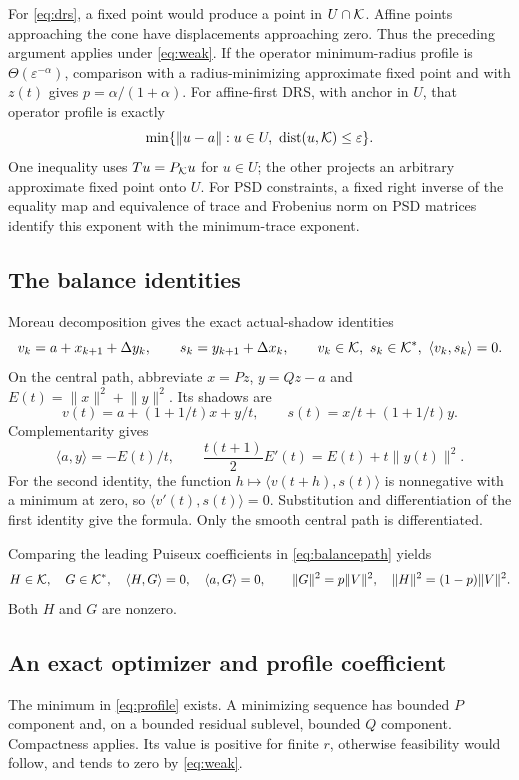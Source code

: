 \documentclass[11pt]{article}
\theoremstyle{remark}\newtheorem{remark}[theorem]{Remark}
\newcommand{\ip}[2]{\langle #1,#2\rangle}\newcommand{\norm}[1]{\lVert #1\rVert}
\newcommand{\eps}{\varepsilon}\newcommand{\dd}{\Delta}
\numberwithin{equation}{section}
\begin{document}
For \eqref{eq:drs}, a fixed point would produce a point in $U\cap\mathcal K$. Affine points approaching the cone have displacements approaching zero. Thus the preceding argument applies under \eqref{eq:weak}. If the operator minimum-radius profile is $\Theta(\eps^{-\alpha})$, comparison with a radius-minimizing approximate fixed point and with $z(t)$ gives $p=\alpha/(1+\alpha)$. For affine-first DRS, with anchor in $U$, that operator profile is exactly
\[
 \min\{\norm{u-a}:u\in U,\ \dist(u,\K)\leq\eps\}.
\]
One inequality uses $Tu=P_\mathcal K u$ for $u\in U$; the other projects an arbitrary approximate fixed point onto $U$. For PSD constraints, a fixed right inverse of the equality map and equivalence of trace and Frobenius norm on PSD matrices identify this exponent with the minimum-trace exponent.

\subsection{The balance identities}
Moreau decomposition gives the exact actual-shadow identities
\begin{equation}\label{eq:complement}
 v_k=a+x_{k+1}+\dd y_k,\qquad
 s_k=y_{k+1}+\dd x_k,\qquad
 v_k\in\K,\ s_k\in\K^*,\ \ip{v_k}{s_k}=0.
\end{equation}
On the central path, abbreviate $x=Pz$, $y=Qz-a$ and $E(t)=\norm x^2+\norm y^2$. Its shadows are
\[
 v(t)=a+(1+1/t)x+y/t,\qquad s(t)=x/t+(1+1/t)y.
\]
Complementarity gives
\begin{equation}\label{eq:balancepath}
 \ip ay=-E(t)/t,\qquad
 \frac{t(t+1)}2E'(t)=E(t)+t\norm{y(t)}^2.
\end{equation}
For the second identity, the function $h\mapsto\ip{v(t+h)}{s(t)}$ is nonnegative with a minimum at zero, so $\ip{v'(t)}{s(t)}=0$. Substitution and differentiation of the first identity give the formula. Only the smooth central path is differentiated.

Comparing the leading Puiseux coefficients in \eqref{eq:balancepath} yields
\begin{equation}\label{eq:balance}
 H\in\K,\quad G\in\K^*,\quad \ip HG=0,\quad \ip aG=0,
 \qquad \norm G^2=p\norm V^2,\quad \norm H^2=(1-p)\norm V^2.
\end{equation}
Both $H$ and $G$ are nonzero.

\subsection{An exact optimizer and profile coefficient}
The minimum in \eqref{eq:profile} exists. A minimizing sequence has bounded $P$ component and, on a bounded residual sublevel, bounded $Q$ component. Compactness applies. Its value is positive for finite $r$, otherwise feasibility would follow, and tends to zero by \eqref{eq:weak}.
\end{document}
